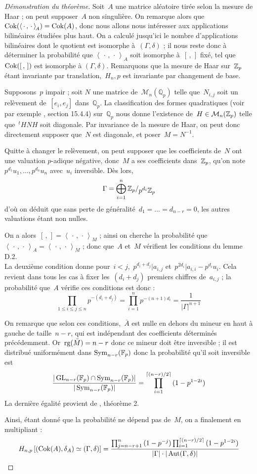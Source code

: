\begin{proof}[Démonstration du théorème]
Soit~$A$ une matrice aléatoire tirée selon la mesure de Haar ; on peut supposer~$A$ non singulière. On remarque alors que~$\operatorname{Cok}(\left<\,\cdot\,,\,\cdot\,\right>_{\!A}) = \operatorname{Cok}(A)$, donc nous allons nous intéresser aux applications bilinéaires étudiées plus haut.
On a calculé jusqu'ici le nombre d'applications bilinéaires dont le quotient est isomorphe à~$(\Gamma, \delta)$ ; il nous reste donc à déterminer la probabilité que $\left<\,\cdot\,,\,\cdot\,\right>_{\!A}$ soit isomorphe à~$[\,,\,]$ fixé, tel que~$\operatorname{Cok}([\,,\,])$ est isomorphe à $(\Gamma,\delta)$. Remarquons que la mesure de Haar sur~$\mathbb{Z}_p$ étant invariante par translation,~$H_n,p$ est invariante par changement de base.

Supposons~$p$ impair ; soit $N$ une matrice de~$\mathcal{M}_n(\mathbb Q_p)$ telle que~$N_{i,j}$ soit un relèvement de~$[e_i, e_j]$ dans~$\mathbb Q_p$. La classification des formes quadratiques (voir par exemple \cite{quad}, section 15.4.4) sur~$\mathbb{Q}_p$ nous donne l'existence de~$H\in\mathcal M_n(\mathbb{Z}_p)$ telle que~${}^tHNH$ soit diagonale. Par invariance de la mesure de Haar, on peut donc directement supposer que~$N$ est diagonale, et poser~$M = N^{-1}$.

Quitte à changer le relèvement, on peut supposer que les coefficients de~$N$ ont une valuation $p$-adique négative, donc~$M$ a ses coefficients dans~$\mathbb{Z}_p$, qu'on note~$p^{d_1}u_1, \dots, p^{d_n}u_n$ avec~$u_i$ inversible. Dès lors,
\[ \Gamma = \bigoplus_{i=1}^{n}\quotient{\Zp}{p^{d_i}\Zp} \]
d'où on déduit que sans perte de généralité~$d_1=\dots=d_{n-r}=0$, les autres valuations étant non nulles.

On a alors~$[\,,\,] = \left<\,\cdot\,,\,\cdot\,\right>_{\!M}$ ; ainsi on cherche la probabilité que~$\left<\,\cdot\,,\,\cdot\,\right>_{\!A}=\left<\,\cdot\,,\,\cdot\,\right>_{\!M}$ ; donc que~$A$ et~$M$ vérifient les conditions du lemme D.2.\\
La deuxième condition donne pour~$i<j$,~$p^{d_i+d_j} | a_{i,j}$ et~$p^{2d_i} | a_{i,i}-p^{d_i}u_i$. Cela revient dans tous les cas à fixer les~$(d_i+d_j)$ premiers chiffres de~$a_{i,j}$ ; la probabilité que~$A$ vérifie ces conditions est donc :
\[ \prod_{1\leq i\leq j\leq n}p^{-(d_i+d_j)} = \prod_{i=1}^{n}p^{-(n+1)d_i} = \frac1{|\Gamma|^{n+1}}\]

On remarque que selon ces conditions,~$\bar A$ est nulle en dehors du mineur en haut à gauche de taille~$n-r$, qui est indépendant des coefficients déterminés précédemment. Or~$\operatorname{rg}(\bar M) = n-r$ donc ce mineur doit être inversible ; il est distribué uniformément dans $\operatorname{Sym}_{n-r}(\mathbb F_p)$ donc la probabilité qu'il soit inversible est
\[ \frac{|\operatorname{GL}_{n-r}(\mathbb F_p)\cap \operatorname{Sym}_{n-r}(\mathbb F_p)|}{|\operatorname{Sym}_{n-r}(\mathbb F_p)|}= \prod_{i=1}^{\lceil (n-r)/2\rceil}{(1-p^{1-2i})} \]
La dernière égalité provient de \cite{sym}, théorème 2.

Ainsi, étant donné que la probabilité ne dépend pas de~$M$, on a finalement en multipliant :
\[ H_{n,p}\left[(\operatorname{Cok}(A),\delta_A) \simeq (\Gamma,\delta)\right] = \frac{\prod_{j=n-r+1}^{n}{(1-p^{-j})}\prod_{i=1}^{\lceil (n-r)/2\rceil}{(1-p^{1-2i})}}{|\Gamma|\cdot|\operatorname{Aut}(\Gamma,\delta)|} \]
\end{proof}